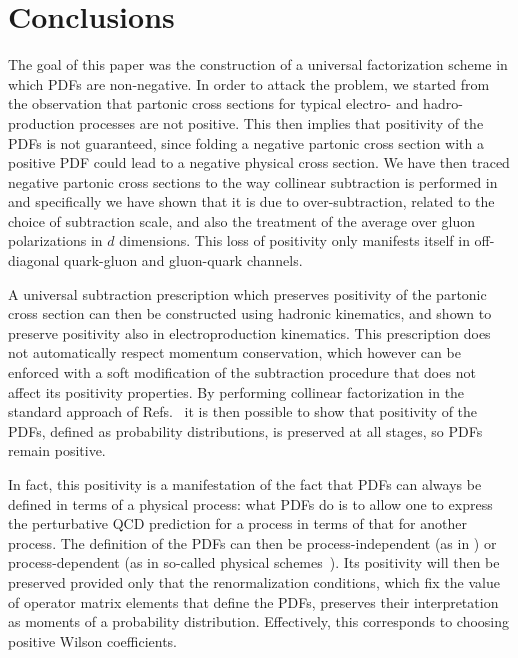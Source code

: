 
\section{Conclusions}
\label{sec:pos/conc}

The goal of this paper was the construction of a universal
factorization scheme in which PDFs are non-negative. In order to
attack the problem, we started from the observation that \msbar{}
partonic cross sections for typical electro- and hadro-production
processes are not positive. This then implies that positivity of the
PDFs is not guaranteed, since folding a negative partonic
cross section with a positive PDF could lead to a negative physical
cross section. We have then traced negative partonic cross sections to
the way collinear subtraction is performed in \msbar{} and specifically
we have shown that it is due to over-subtraction, related to the choice of subtraction scale, 
and also the treatment of the average over gluon polarizations in $d$
dimensions. This loss of positivity only manifests itself  in off-diagonal quark-gluon and
gluon-quark channels.

A universal subtraction prescription  which preserves positivity of the partonic
cross section can then be constructed using hadronic kinematics, and
shown to preserve positivity also in electroproduction kinematics. This
prescription does not automatically respect momentum conservation,
which however can be enforced with a soft modification of the subtraction
procedure that does not affect its positivity properties. By
performing collinear factorization in the standard approach of
Refs.~\cite{Collins:1981uw,Curci:1980uw} it is then possible to show
that positivity of the PDFs, defined  as probability
distributions, is preserved at all stages, so PDFs remain positive.

In fact, this positivity is a manifestation of the fact that PDFs can
always be defined in terms of a physical process: what PDFs do is to
allow one to express the perturbative QCD prediction for a process in
terms of that for another process. The definition of the PDFs can then
be 
process-independent (as in \msbar{}) or process-dependent (as
in so-called physical schemes~\cite{Catani:1995ze,Diemoz:1987xu}).
Its positivity will then be preserved provided only that the renormalization
conditions, which fix the value of operator matrix elements that
define the PDFs, preserves their interpretation as moments of a
probability distribution. Effectively, this corresponds to choosing
positive Wilson coefficients.

